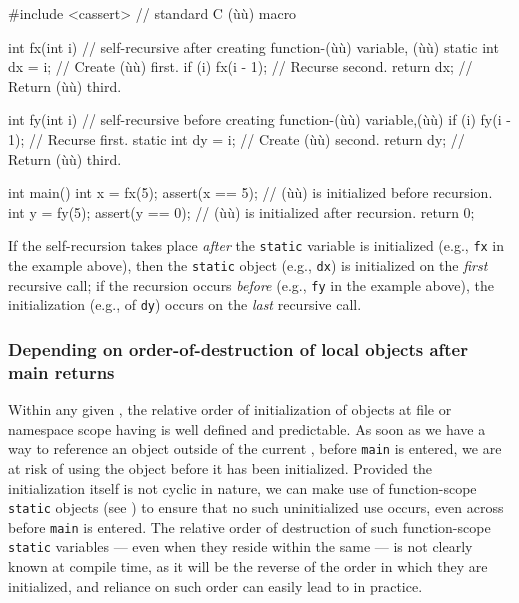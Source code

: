 \begin{emcppshiddenlisting}[emcppsbatch=e2]
#include <cassert>  // standard C (ù{}ù) macro
\end{emcppshiddenlisting}
\begin{emcppslisting}[emcppsbatch=e2]
int fx(int i)  // self-recursive after creating function-(ù{}ù) variable, (ù{}ù)
{
    static int dx = i;     // Create (ù{}ù) first.
    if (i) { fx(i - 1); }  // Recurse second.
    return dx;             // Return (ù{}ù) third.
}

int fy(int i)  // self-recursive before creating function-(ù{}ù) variable,(ù{}ù)
{
    if (i) { fy(i - 1); }  // Recurse first.
    static int dy = i;     // Create (ù{}ù) second.
    return dy;             // Return (ù{}ù) third.
}

int main()
{
    int x = fx(5);  assert(x == 5);  // (ù{}ù) is initialized before recursion.
    int y = fy(5);  assert(y == 0);  // (ù{}ù) is initialized after recursion.
    return 0;
}
\end{emcppslisting}

\noindent If the self-recursion takes place \emph{after} the \lstinline!static!
variable is initialized (e.g., \lstinline!fx! in the example above), then the
\lstinline!static! object (e.g., \lstinline!dx!) is initialized on the
\emph{first} recursive call; if the recursion occurs \emph{before}
(e.g., \lstinline!fy! in the example above), the initialization (e.g., of \lstinline!dy!)
occurs on the \emph{last} recursive call.


\subsubsection[Depending on order-of-destruction of local objects after {\tt main} returns]{Depending on order-of-destruction of local objects after {\SubsubsecCode main} returns}\label{depending-on-order-of-destruction-of-local-objects-after-main-returns}

Within any given , the relative order of initialization
of objects at file or namespace scope having  is
well defined and predictable. As soon as we have a way to reference an
object outside of the current , before \lstinline!main! is
entered, we are at risk of using the object before it has been
initialized. Provided the initialization itself is not cyclic in nature,
we can make use of function-scope \lstinline!static! objects (see ) to
ensure that no such uninitialized use occurs, even across 
before \lstinline!main! is entered. The relative order of destruction
of such function-scope \lstinline!static! variables --- even when they
reside within the same  --- is not clearly known at compile time,
as it will be the reverse of the order in which they are initialized, and
reliance on such order can easily lead to  in
practice.

